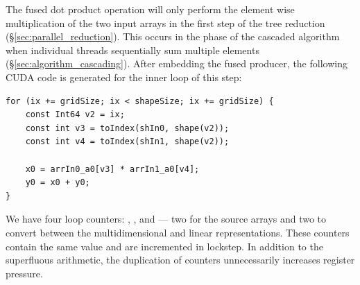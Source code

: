 The fused dot product operation will only perform the element wise
multiplication of the two input arrays in the first step of the tree reduction
(\S\ref{sec:parallel_reduction}). This occurs in the phase of the cascaded
algorithm when individual threads sequentially sum multiple elements
(\S\ref{sec:algorithm_cascading}). After embedding the fused producer, the
following CUDA code is generated for the inner loop of this step:
%
%
%
\begin{lstlisting}[style=cuda
    ,firstnumber=18
    ,label=lst:dotp_cuda
    ,caption={Generated CUDA code for the first step of fused dot product}]
for (ix += gridSize; ix < shapeSize; ix += gridSize) {
    const Int64 v2 = ix;
    const int v3 = toIndex(shIn0, shape(v2));
    const int v4 = toIndex(shIn1, shape(v2));

    x0 = arrIn0_a0[v3] * arrIn1_a0[v4];
    y0 = x0 + y0;
}
\end{lstlisting}
%
We have four loop counters: , ,  and  ---
two for the source arrays and two to convert between the multidimensional and
linear representations. These counters contain the same value and are
incremented in lockstep. In addition to the superfluous arithmetic, the
duplication of counters unnecessarily increases register pressure.

